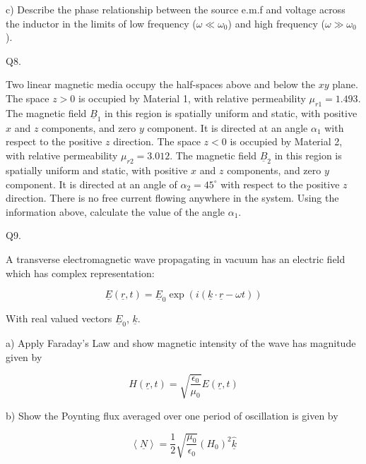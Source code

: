 \documentclass[a4paper,11pt]{article}
\begin{document}
\medskip

\noindent c) Describe the phase relationship between the source e.m.f and voltage across the inductor in the limits of low frequency (\( \omega \ll \omega_{0} \)) and high frequency (\( \omega \gg \omega_{0} \)).

\bigskip

\noindent Q8. 

\noindent Two linear magnetic media occupy the half-spaces above and below the \( xy \) plane. The space \( z > 0 \) is occupied by Material 1, with relative permeability \( \mu_{r1} = 1.493 \). The magnetic field \( \underline{B}_{1} \) in this region is spatially uniform and static, with positive \( x \) and \( z \) components, and zero \( y \) component. It is directed at an angle \( \alpha_{1} \) with respect to the positive \( z \) direction. The space \( z < 0 \) is occupied by Material 2, with relative permeability \( \mu_{r2}= 3.012 \). The magnetic field \( \underline{B}_{2} \) in this region is spatially uniform and static, with positive \( x \) and \( z \) components, and zero \( y \) component. It is directed at an angle of \( \alpha_{2} = 45^\circ \) with respect to the positive \( z \) direction. There is no free current flowing anywhere in the system. Using the information above, calculate the value of the angle \( \alpha_{1} \). 

\bigskip

\noindent Q9. 

\noindent A transverse electromagnetic wave propagating in vacuum has an electric field which has complex representation:

\[ \underline{E}(\underline{r}, t) = \underline{E}_{0} \exp (i(\underline{k} \cdot \underline{r} - \omega t)) \]

\noindent With real valued vectors \( \underline{E}_{0} \), \( \underline{k} \).

\medskip 

\noindent a) Apply Faraday’s Law and show magnetic intensity of the wave has magnitude given by 

\[ H(\underline{r}, t) = \sqrt{\frac{\epsilon_{0}}{\mu_{0}}} E(\underline{r}, t) \]

\medskip

\noindent b) Show the Poynting flux averaged over one period of oscillation is given by 

\[ \left< \underline{N} \right> = \frac{1}{2} \sqrt{\frac{\mu_{0}}{\epsilon_{0}}} (H_{0})^{2} \hat{\underline{k}} \]
\end{document}
